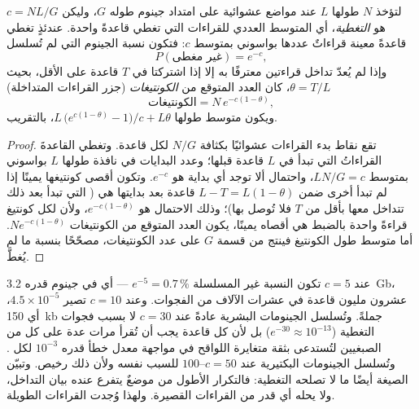 \begin{theorem}\label{thm:b3:genomics:lander-waterman}
لتؤخذ $N$  طولها $L$ عند مواضع عشوائية على امتداد
جينوم طوله $G$، وليكن $c = NL/G$ هو \emph{التغطية}، أي
المتوسط العددي للقراءات التي تغطي قاعدةً واحدة. عندئذٍ تغطي قاعدةً
معينة قراءاتٌ عددها بواسوني بمتوسط $c$: فتكون نسبة
الجينوم التي لم تُسلسل
\[
P(\text{غير مغطى}) = e^{-c},
\]
وإذا لم يُعدّ تداخل قراءتين معترفًا به إلا إذا اشتركتا في
$T$ قاعدة على الأقل، بحيث $\theta = T/L$، كان العدد المتوقع من
\emph{الكونتيغات} (جزر القراءات المتداخلة)
\[
\text{الكونتيغات} = N\,e^{-c(1-\theta)},
\]
ويكون متوسط طولها $L\,\bigl(e^{c(1-\theta)} - 1\bigr)/c + L\theta$،
بالتقريب.
\end{theorem}
\begin{proof}
تقع نقاط بدء القراءات عشوائيًا بكثافة $N/G$ لكل قاعدة. وتغطي القاعدةَ
القراءاتُ التي تبدأ في $L$ قاعدة قبلها؛ وعدد
البدايات في نافذة طولها $L$ بواسوني بمتوسط $LN/G
= c$، واحتمال ألا توجد أي بداية هو $e^{-c}$. وتكون  أقصى
كونتيغها يمينًا إذا لم تبدأ  أخرى ضمن $L - T = L(1-\theta)$
قاعدة بعد بدايتها هي ( التي تبدأ بعد ذلك تتداخل معها
بأقل من $T$ فلا تُوصل بها)؛ وذلك الاحتمال هو $e^{-c(1-\theta)}$،
ولأن لكل كونتيغ قراءةً واحدة بالضبط هي أقصاه يمينًا، يكون العدد
المتوقع من الكونتيغات $N e^{-c(1-\theta)}$. أما متوسط طول الكونتيغ
فينتج من قسمة $G$ على عدد الكونتيغات، مصحّحًا بنسبة
ما لم يُغطَّ.
\end{proof}

\begin{example}[كم يكفي]\label{ex:b3:genomics:coverage}
عند $c = 5$ تكون النسبة غير المسلسلة $e^{-5} = 0.7\,\%$ --- أي في
جينوم قدره \qty{3.2}{Gb}، عشرون مليون قاعدة في عشرات الآلاف من
الفجوات. وعند $c = 10$ تصير $4.5\times 10^{-5}$، أي \qty{150}{kb} جملةً.
وتُسلسل الجينومات البشرية عادةً عند $c = 30$ لا بسبب فجوات
التغطية ($e^{-30} \approx 10^{-13}$) بل لأن كل قاعدة يجب أن
تُقرأ مرات عدة على كل من الصبغيين لتُستدعى بثقة
متغايرة اللواقح في مواجهة معدل خطأ قدره $10^{-3}$
لكل . وتُسلسل الجينومات البكتيرية عند $c = 50$--$100$
للسبب نفسه ولأن ذلك رخيص. وتبيّن الصيغة أيضًا ما لا تصلحه
التغطية: فالتكرار الأطول من  موضعٌ يتفرع عنده بيان
التداخل، ولا يحله أي قدر من القراءات القصيرة. ولهذا وُجدت
القراءات الطويلة.
\end{example}

